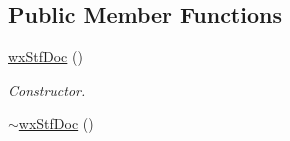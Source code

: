 \subsection*{Public Member Functions}
\begin{DoxyCompactItemize}
\item 
\hyperlink{classwxStfDoc_ad4ee4f13f7122ae8127b12056f4c5c49}{wxStfDoc} ()
\begin{DoxyCompactList}\small\item\em Constructor. \item\end{DoxyCompactList}\item 
\hypertarget{classwxStfDoc_af08b1b2f973cc9ff74bdce3b645b07f0}{
\hyperlink{classwxStfDoc_af08b1b2f973cc9ff74bdce3b645b07f0}{$\sim$wxStfDoc} ()}
\label{classwxStfDoc_af08b1b2f973cc9ff74bdce3b645b07f0}


\end{DoxyCompactItemize}
